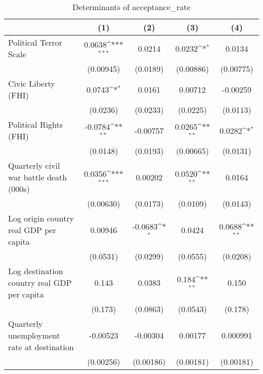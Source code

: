 \begin{table}[htbp]\centering
\def\sym#1{\ifmmode^{#1}\else\(^{#1}\)\fi}
\caption{Determinants of acceptance\_rate}
\begin{tabular}{l*{4}{c}}
\hline\hline
                    &\multicolumn{1}{c}{(1)}         &\multicolumn{1}{c}{(2)}         &\multicolumn{1}{c}{(3)}         &\multicolumn{1}{c}{(4)}         \\
\hline
Political Terror Scale&      0.0638\sym{***}&      0.0214         &      0.0232\sym{*}  &      0.0134         \\
                    &   (0.00945)         &    (0.0189)         &   (0.00886)         &   (0.00775)         \\
[1em]
Civic Liberty (FHI) &      0.0743\sym{*}  &      0.0161         &     0.00712         &    -0.00259         \\
                    &    (0.0236)         &    (0.0233)         &    (0.0225)         &    (0.0113)         \\
[1em]
Political Rights (FHI)&     -0.0784\sym{**} &    -0.00757         &      0.0265\sym{**} &      0.0282\sym{*}  \\
                    &    (0.0148)         &    (0.0193)         &   (0.00665)         &    (0.0131)         \\
[1em]
Quarterly civil war battle death (000s)&      0.0356\sym{***}&     0.00202         &      0.0520\sym{**} &      0.0164         \\
                    &   (0.00630)         &    (0.0173)         &    (0.0109)         &    (0.0143)         \\
[1em]
Log origin country real GDP per capita&     0.00946         &     -0.0683\sym{*}  &      0.0424         &      0.0688\sym{**} \\
                    &    (0.0531)         &    (0.0299)         &    (0.0555)         &    (0.0208)         \\
[1em]
Log destination country real GDP per capita&       0.143         &      0.0383         &       0.184\sym{**} &       0.150         \\
                    &     (0.173)         &    (0.0863)         &    (0.0543)         &     (0.178)         \\
[1em]
Quarterly unemployment rate at destination&    -0.00523         &    -0.00304         &     0.00177         &    0.000991         \\
                    &   (0.00256)         &   (0.00186)         &   (0.00181)         &   (0.00181)         \\

\end{tabular}
\end{table}
